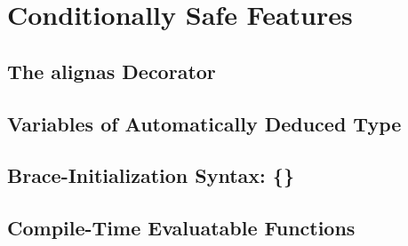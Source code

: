 
\chapter[Conditionally Safe Features]{Conditionally Safe Features}\label{ch-conditional}

\renewcommand{\cppxx}{C++11}

\newpage
{}
\section[{\tt alignas}~]{The {\SecCode alignas} Decorator}\label{alignas}


\newpage
%
\section[{\tt auto} Variables]{Variables of Automatically Deduced Type}\label{auto}\label{auto-feature}


\newpage
 \section[Braced Init]{Brace-Initialization Syntax: {\SecCode \{\}}}\label{bracedinit}


\newpage
\section[{\tt constexpr} Functions]{Compile-Time Evaluatable Functions}\label{constexprfunc}


